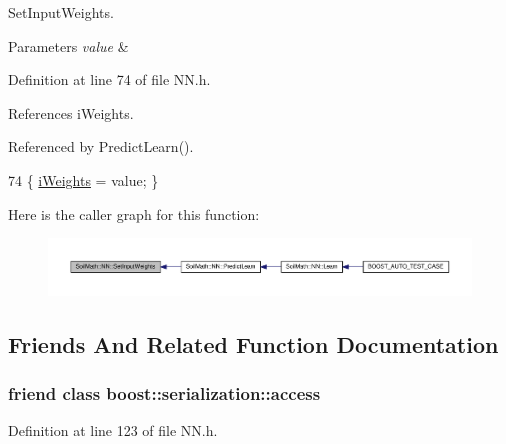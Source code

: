 Set\+Input\+Weights. 


\begin{DoxyParams}{Parameters}
{\em value} & \\
\hline
\end{DoxyParams}


Definition at line 74 of file N\+N.\+h.



References i\+Weights.



Referenced by Predict\+Learn().


\begin{DoxyCode}
74 \{ \hyperlink{class_soil_math_1_1_n_n_a96b0fe3caeed3d285204a6b4506075c9}{iWeights} = value; \}
\end{DoxyCode}


Here is the caller graph for this function\+:
\nopagebreak
\begin{figure}[H]
\begin{center}
\leavevmode
\includegraphics[width=350pt]{class_soil_math_1_1_n_n_a411371d8297e9d1ff10c919d1293d80e_icgraph}
\end{center}
\end{figure}




\subsection{Friends And Related Function Documentation}
\hypertarget{class_soil_math_1_1_n_n_ac98d07dd8f7b70e16ccb9a01abf56b9c}{}
\subsubsection[{boost\+::serialization\+::access}]{\setlength{\rightskip}{0pt plus 5cm}friend class boost\+::serialization\+::access\hspace{0.3cm}{\ttfamily [friend]}}\label{class_soil_math_1_1_n_n_ac98d07dd8f7b70e16ccb9a01abf56b9c}


Definition at line 123 of file N\+N.\+h.




